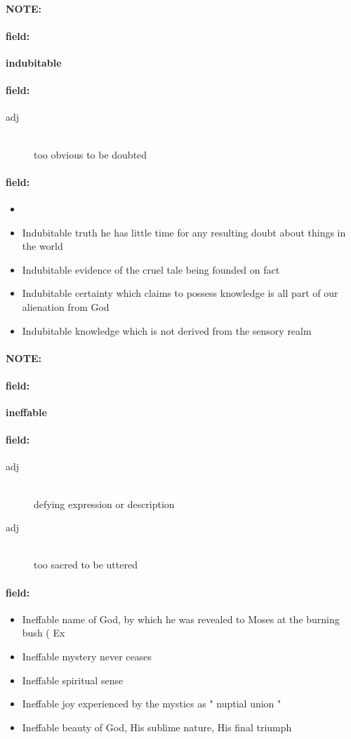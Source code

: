 \documentclass[12pt]{article}
\newenvironment{note}{\paragraph{NOTE:}}{}
\newenvironment{field}{\paragraph{field:}}{}
\begin{document}
\begin{note}
\begin{field}
\textbf{\large indubitable}
\end{field}


\begin{field}
\begin{description}
\item[adj] \hfill \\ 
too obvious to be doubted

\end{description}
\end{field}

\begin{field}
\begin{itemize}
\item 
\item Indubitable truth he has little time for any resulting doubt about things in the world
\item Indubitable evidence of the cruel tale being founded on fact
\item Indubitable certainty which claims to possess knowledge is all part of our alienation from God
\item Indubitable knowledge which is not derived from the sensory realm
\end{itemize}
\end{field}
\end{note}
\begin{note}
\begin{field}
\textbf{\large ineffable}
\end{field}


\begin{field}
\begin{description}
\item[adj] \hfill \\ 
defying expression or description

\item[adj] \hfill \\ 
too sacred to be uttered

\end{description}
\end{field}

\begin{field}
\begin{itemize}
\item Ineffable name of God, by which he was revealed to Moses at the burning bush ( Ex
\item Ineffable mystery never ceases
\item Ineffable spiritual sense
\item Ineffable joy experienced by the mystics as " nuptial union " 
\item Ineffable beauty of God, His sublime nature, His final triumph
\end{itemize}
\end{field}
\end{note}
\end{document}
